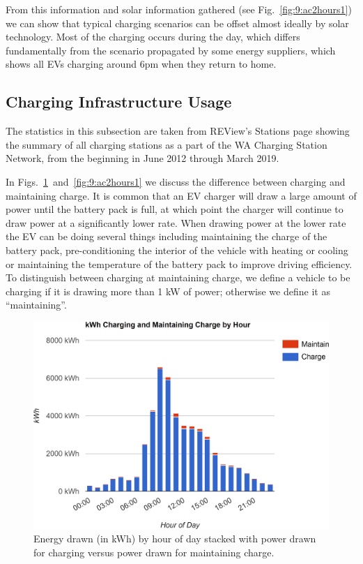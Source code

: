 From this information and solar information gathered (see Fig.~\ref{fig:9:ac2hours1}) we can show that typical charging scenarios can be offset almost ideally by solar technology. Most of the charging occurs during the day, which differs fundamentally from the scenario propagated by some energy suppliers, which shows all EVs charging around 6pm when they return to home. 

\subsection{Charging Infrastructure Usage}
The statistics in this subsection are taken from REView’s Stations page showing the summary of all charging stations as a part of the WA Charging Station Network, from the beginning in June 2012 through March 2019.

In Figs.~\ref{fig:9:ac2kwh1}~and~\ref{fig:9:ac2hours1} we discuss the difference between charging and maintaining charge. It is common that an EV charger will draw a large amount of power until the battery pack is full, at which point the charger will continue to draw power at a significantly lower rate. When drawing power at the lower rate the EV can be doing several things including maintaining the charge of the battery pack, pre-conditioning the interior of the vehicle with heating or cooling or maintaining the temperature of the battery pack to improve driving efficiency. To distinguish between charging at maintaining charge, we define a vehicle to be charging if it is drawing more than 1 kW of power; otherwise we define it as “maintaining”.

\begin{figure}[H]
	\centering
	\includegraphics[width=0.8\linewidth]{ac2kwh1}
	\caption[Energy drawn by hour of day]{Energy drawn (in kWh) by hour of day stacked with power drawn for charging versus power drawn for maintaining charge.}
	\label{fig:9:ac2kwh1}
\end{figure}

